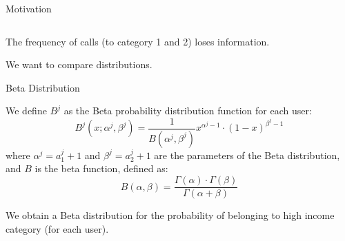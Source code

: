 \documentclass[usenames,dvipsnames]{beamer}
\newcommand{\Beta}{B}
\begin{document}
\begin{frame}{Motivation}
\begin{columns}
\begin{column}{0.49\textwidth}
\end{column}
\end{columns}

\medskip

The frequency of calls (to category 1 and 2) loses information.

We want to compare distributions.

\end{frame}



\begin{frame}{Beta Distribution}

We define \(\Beta^j\) as the Beta probability distribution function for each user:
\begin{equation}
	\Beta^j \left( x; \alpha^j, \beta^j \right) = \frac{1}{\Beta \left( \alpha^j, \beta^j \right)} x^{\alpha^j - 1} \cdot {\left( 1 - x \right)}^{\beta^j - 1}
\label{Beta}
\end{equation}
where $\alpha^j = a^j_1 +1$ and $\beta^j = a^j_2 +1$ are the parameters of the Beta distribution,
and $\Beta$ is the beta function, defined as:
\begin{equation}
\Beta \left( \alpha, \beta \right) =
\frac{\Gamma \! \left( \alpha \right) \cdot \Gamma \! \left( \beta \right)}
{\Gamma \! \left( \alpha + \beta \right)}
\label{Beta}
\end{equation}

We obtain a Beta distribution for the probability of belonging to high income category (for each user).

\end{frame}
\end{document}
